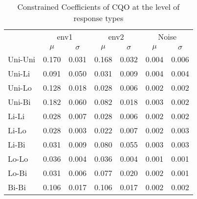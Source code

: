 			\begin{table*}[h!] 
				
				\normalsize
				\caption{Constrained Coefficients of CQO at the level of response types}
				\centering
				
				\begin{tabular}{@{}lcccccc@{}}
					
					\toprule
					& \multicolumn{2}{c}{env1} & \multicolumn{2}{c}{env2} & \multicolumn{2}{c}{Noise}\\\cmidrule(l){2-3} \cmidrule(l){4-5} \cmidrule(l){6-7}
					& $\mu$ & $\sigma$ & $\mu$ & $\sigma$ & $\mu$ & $\sigma$\\
					\hline
					Uni-Uni  & 0.170 & 0.031 & 0.168 & 0.032 & 0.004 & 0.006 \\
					Uni-Li   & 0.091 & 0.050 & 0.031 & 0.009 & 0.004 & 0.004 \\
					Uni-Lo   & 0.128 & 0.018 & 0.028 & 0.006 & 0.002 & 0.002 \\
					Uni-Bi   & 0.182 & 0.060 & 0.082 & 0.018 & 0.003 & 0.002 \\
					Li-Li    & 0.028 & 0.007 & 0.028 & 0.006 & 0.002 & 0.002 \\
					Li-Lo    & 0.028 & 0.003 & 0.022 & 0.007 & 0.002 & 0.003 \\
					Li-Bi    & 0.031 & 0.009 & 0.080 & 0.055 & 0.003 & 0.003 \\
					Lo-Lo    & 0.036 & 0.004 & 0.036 & 0.004 & 0.001 & 0.001 \\
					Lo-Bi    & 0.031 & 0.006 & 0.077 & 0.020 & 0.002 & 0.001 \\
					Bi-Bi    & 0.106 & 0.017 & 0.106 & 0.017 & 0.002 & 0.002 \\
					\toprule
				\end{tabular}
			
				\label{tab:cqosm1}
			
			\end{table*}
			
